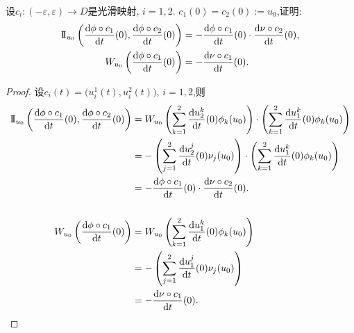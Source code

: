 	\begin{excise}
		设$c_{i}:(-\varepsilon,\varepsilon)\to D$是光滑映射, $i=1,2$. $c_{1}(0)=c_{2}(0):=u_{0}$,证明:
		\begin{align*}
		\mathrm{I\!I}_{u_{0}}\left( \frac{\mathrm{d}\phi\circ c_{1}}{\mathrm{d} t}(0), \frac{\mathrm{d}\phi\circ c_{2}}{\mathrm{d} t}(0)\right)&=-\frac{\mathrm{d}\phi\circ c_{1}}{\mathrm{d} t}(0)\cdot\frac{\mathrm{d}\nu\circ c_{2}}{\mathrm{d} t}(0),\\
		W_{u_{0}}\left( \frac{\mathrm{d}\phi\circ c_{1}}{\mathrm{d} t}(0) \right)&=-\frac{\mathrm{d}\nu\circ c_{1}}{\mathrm{d} t}(0).
		\end{align*}
	\end{excise}
	\begin{proof}
		设$c_{i}(t)=\bigl(u_{i}^{1}(t),u_{i}^{2}(t)\bigr)$, $i=1,2$,则
		\begin{align*}
			\mathrm{I\!I}_{u_{0}}\left( \frac{\mathrm{d}\phi\circ c_{1}}{\mathrm{d} t}(0), \frac{\mathrm{d}\phi\circ c_{2}}{\mathrm{d} t}(0)\right)&=W_{u_{0}}\left(\sum_{k=1}^{2}\frac{\mathrm{d} u_{2}^{k}}{\mathrm{d} t}(0)\phi_{k}(u_{0})\right)\cdot \left(\sum_{k=1}^{2}\frac{\mathrm{d} u_{1}^{k}}{\mathrm{d} t}(0)\phi_{k}(u_{0})\right)\\
			&=-\left(\sum_{j=1}^{2}\frac{\mathrm{d} u_{2}^j}{\mathrm{d} t}(0)\nu_{j}(u_{0})\right)\cdot\left(\sum_{k=1}^{2}\frac{\mathrm{d} u_{1}^{k}}{\mathrm{d} t}(0)\phi_{k}(u_{0})\right)\\
			&=-\frac{\mathrm{d}\phi\circ c_{1}}{\mathrm{d} t}(0)\cdot\frac{\mathrm{d}\nu\circ c_{2}}{\mathrm{d} t}(0).\\ \\
			W_{u_{0}}\left( \frac{\mathrm{d}\phi\circ c_{1}}{\mathrm{d} t}(0) \right)&=W_{u_{0}}\left(\sum_{k=1}^{2}\frac{\mathrm{d} u_{1}^{k}}{\mathrm{d} t}(0)\phi_{k}(u_{0})\right)\\
			&=-\left(\sum_{j=1}^{2}\frac{\mathrm{d} u_{1}^j}{\mathrm{d} t}(0)\nu_{j}(u_{0})\right)\\
			&=-\frac{\mathrm{d}\nu\circ c_{1}}{\mathrm{d} t}(0).
		\end{align*}
	\end{proof}

